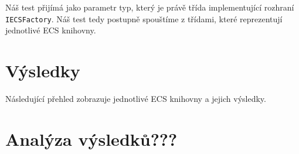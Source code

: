 Náš test přijímá jako parametr typ, který je právě třída implementující rozhraní \texttt{IECSFactory}. Náš test tedy postupně spouštíme z třídami, které reprezentují jednotlivé ECS knihovny.

\section{Výsledky}
Následující přehled zobrazuje jednotlivé ECS knihovny a jejich výsledky.


\section{Analýza výsledků???}

















